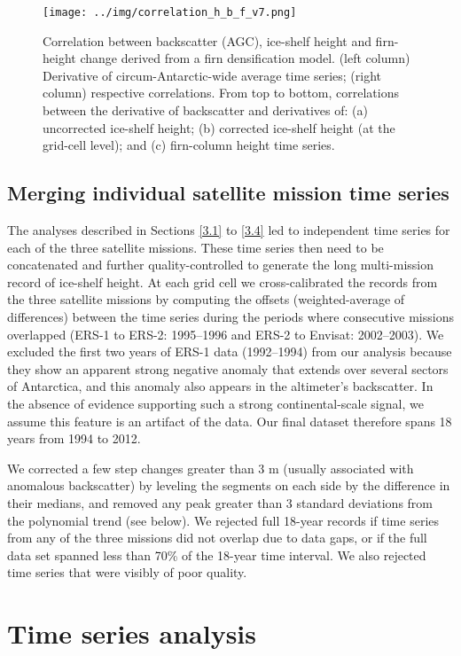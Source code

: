 \begin{figure}[!ht]
  \texttt{[image: ../img/correlation\_h\_b\_f\_v7.png]}
  \caption{
  Correlation between backscatter (AGC), ice-shelf height and firn-height change derived from a firn densification model. (left column) Derivative of circum-Antarctic-wide average time series; (right column) respective correlations. From top to bottom, correlations between the derivative of backscatter and derivatives of: (a) uncorrected ice-shelf height; (b) corrected ice-shelf height (at the grid-cell level); and (c) firn-column height time series.
  } 
  \label{c2f5}
\end{figure}

\subsection{Merging individual satellite mission time series}

The analyses described in Sections \ref{3.1} to \ref{3.4} led to independent time series for each of the three satellite missions. These time series then need to be concatenated and further quality-controlled to generate the long multi-mission record of ice-shelf height. At each grid cell we cross-calibrated the records from the three satellite missions by computing the offsets (weighted-average of differences) between the time series during the periods where consecutive missions overlapped (ERS-1 to ERS-2: 1995--1996 and ERS-2 to Envisat: 2002--2003). We excluded the first two years of ERS-1 data (1992--1994) from our analysis because they show an apparent strong negative anomaly that extends over several sectors of Antarctica, and this anomaly also appears in the altimeter's backscatter. In the absence of evidence supporting such a strong continental-scale signal, we assume this feature is an artifact of the data. Our final dataset therefore spans 18 years from 1994 to 2012.

We corrected a few step changes greater than 3 m (usually associated with anomalous backscatter) by leveling the segments on each side by the difference in their medians, and removed any peak greater than 3 standard deviations from the polynomial trend (see below). We rejected full 18-year records if time series from any of the three missions did not overlap due to data gaps, or if the full data set spanned less than 70\% of the 18-year time interval. We also rejected time series that were visibly of poor quality.

\section{Time series analysis}

